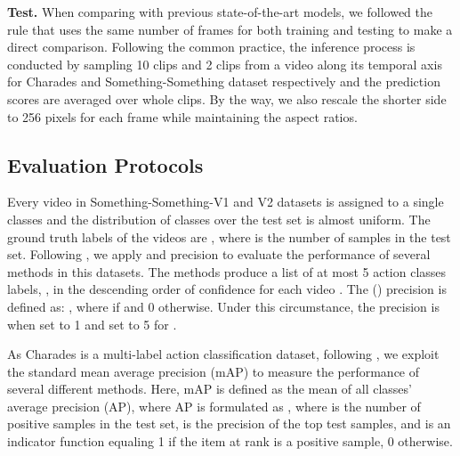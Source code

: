 \documentclass[conference,compsoc]{IEEEtran}
\begin{document}
    \textbf{Test.} When comparing with previous state-of-the-art models, we followed the rule that uses the same number of frames for both training and testing to make a direct comparison. Following the common practice, the inference process is conducted by sampling 10 clips and 2 clips from a video along its temporal axis for Charades and Something-Something dataset respectively and the prediction scores are averaged over whole clips. By the way, we also rescale the shorter side to 256 pixels for each frame while maintaining the aspect ratios.
    
    
    
\subsection{Evaluation Protocols}
    Every video in Something-Something-V1 and V2 datasets is assigned to a single classes and the distribution of classes over the test set is almost uniform. The ground truth labels of the videos are , where  is the number of samples in the test set. Following \cite{goyal2017something, wang2018videos, zhou2018temporal}, we apply  and  precision to evaluate the performance of several methods in this datasets. The methods produce a list of at most 5 action classes labels, , in the descending order of confidence for each video . The  () precision is defined as: , where  if  and 0 otherwise. Under this circumstance, the  precision is when  set to 1 and  set to 5 for .
    
    As Charades is a multi-label action classification dataset, following \cite{sigurdsson2016hollywood, wang2018videos, zhou2018temporal}, we exploit the standard mean average precision (mAP) to measure the performance of several different methods. Here, mAP is defined as the mean of all classes' average precision (AP), where AP is formulated as , where  is the number of positive samples in the test set,  is the precision of the top  test samples, and  is an indicator function equaling 1 if the item at rank  is a positive sample, 0 otherwise.
 
\end{document}
